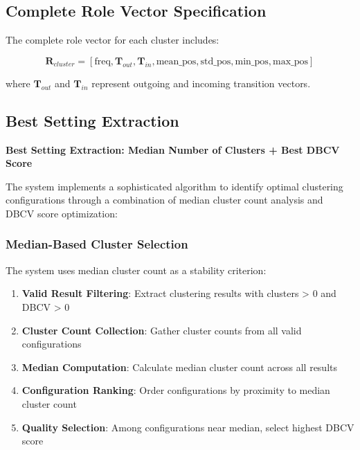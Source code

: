 \subsection{Complete Role Vector Specification}
\label{subsec:complete-role-vector}

The complete role vector for each cluster includes:

\begin{equation}
\mathbf{R}_{cluster} = [\text{freq}, \mathbf{T}_{out}, \mathbf{T}_{in}, \text{mean\_pos}, \text{std\_pos}, \text{min\_pos}, \text{max\_pos}]
\end{equation}

where $\mathbf{T}_{out}$ and $\mathbf{T}_{in}$ represent outgoing and incoming transition vectors.



\subsection{Best Setting Extraction}
\label{subsec:best-setting-extraction}

\textbf{Best Setting Extraction: Median Number of Clusters + Best DBCV Score}

The system implements a sophisticated algorithm to identify optimal clustering configurations through a combination of median cluster count analysis and DBCV score optimization:

\subsubsection{Median-Based Cluster Selection}
The system uses median cluster count as a stability criterion:

\begin{enumerate}
    \item \textbf{Valid Result Filtering}: Extract clustering results with clusters > 0 and DBCV > 0
    \item \textbf{Cluster Count Collection}: Gather cluster counts from all valid configurations
    \item \textbf{Median Computation}: Calculate median cluster count across all results
    \item \textbf{Configuration Ranking}: Order configurations by proximity to median cluster count
    \item \textbf{Quality Selection}: Among configurations near median, select highest DBCV score
\end{enumerate}


